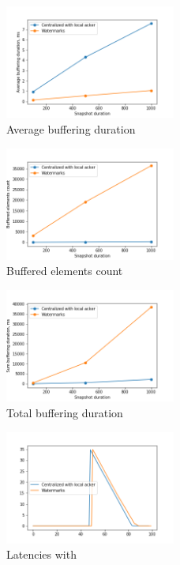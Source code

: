 \begin{figure}[htbp]
  \centering
  \includegraphics[width=0.50\textwidth]{buffering_average_duration.png}
  \caption{Average buffering duration}
\end{figure}
\begin{figure}[htbp]
  \centering
  \includegraphics[width=0.50\textwidth]{buffering_count.png}
  \caption{Buffered elements count}
\end{figure}
\begin{figure}[htbp]
  \centering
  \includegraphics[width=0.50\textwidth]{buffering_sum_duration.png}
  \caption{Total buffering duration}
\end{figure}
\begin{figure}[htbp]
  \centering
  \includegraphics[width=0.50\textwidth]{buffering_latencies_evolution_acker.png}
  \caption{Latencies with \tracker}
\end{figure}
